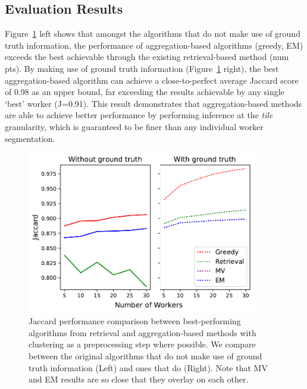  \subsection{Evaluation Results}
\par \noindent Figure~\ref{retrieval_vs_aggregation} left shows that amongst the algorithms that do not make use of ground truth information, the performance of aggregation-based algorithms (greedy, EM) exceeds the best achievable through the existing retrieval-based method (num pts). By making use of ground truth information (Figure~\ref{retrieval_vs_aggregation} right), the best aggregation-based algorithm can achieve a close-to-perfect average Jaccard score of 0.98 as an upper bound, far exceeding the results achievable by any single `best' worker (J=0.91). This result demonstrates that aggregation-based methods are able to achieve better performance by performing inference at the \textit{tile} granularity, which is guaranteed to be finer than any individual worker segmentation. 
\begin{figure}[h!]
   \vspace{-10pt}
   \centering
   \includegraphics[width=0.9\textwidth]{plots/Retrieval_vs_Aggregation.pdf}
   \caption{Jaccard performance comparison between best-performing algorithms from retrieval and aggregation-based methods with clustering as a preprocessing step where possible. We compare between the original algorithms that do not make use of ground truth information (Left) and ones that do (Right). Note that MV and EM results are so close that they overlay on each other.}
   \label{retrieval_vs_aggregation}   
\end{figure} 

